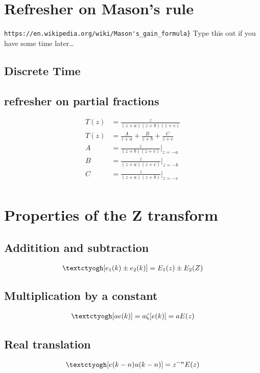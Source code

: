 \documentclass{report}
\begin{document}
\section{Refresher on Mason's rule}

\verb|https://en.wikipedia.org/wiki/Mason's_gain_formula}|
Type this out if you have some time later\dots
\subsection{Discrete Time} %
\label{sub:discrete_time}

\subsection{refresher on partial fractions}
\begin{align*}
	T(z) &=  \frac{z}{(z+a)(z+b)(z+c)}\\
	T(z) &= \frac{A}{z+a} + \frac{B}{z+b} + \frac{C}{z+c}\\
	A &=  \frac{z}{(z+b)(z+c)} \bigg\rvert_{z=-a}\\
	B &=  \frac{z}{(z+a)(z+c)} \bigg\rvert_{z=-b}\\
	C &=  \frac{z}{(z+a)(z+b)} \bigg\rvert_{z=-c}\\
\end{align*}
\section{Properties of the Z transform}
\label{sub:Properties of the Z transform}
\subsection{Additition and subtraction}
\begin{align*}
	\text{\textctyogh}[e_1(k) \pm e_2(k)] = E_1(z) \pm E_2(Z)\\
\end{align*}
\subsection{Multiplication by a constant}
\begin{align*}
	\text{\textctyogh}[ae(k)] = a\zeta[e(k)] = aE(z)\\
\end{align*}
\subsection{Real translation}
\begin{align*}
	\text{\textctyogh}[e(k-n)u(k-n)] = z^{-n} E(z)\\
\end{align*}
\end{document}
